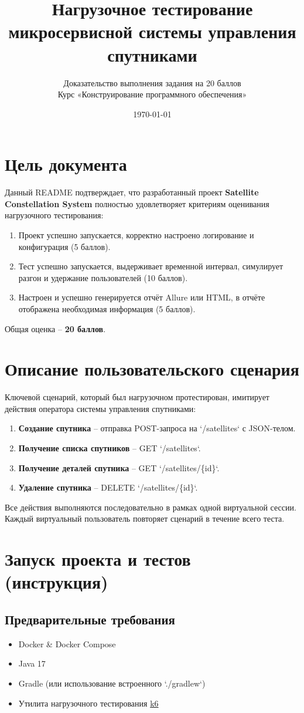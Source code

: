 \documentclass[12pt,a4paper]{article}
\title{\textbf{Нагрузочное тестирование микросервисной системы управления спутниками}}
\author{Доказательство выполнения задания на 20 баллов \\ \small Курс «Конструирование программного обеспечения»}
\date{\today}
\begin{document}
\maketitle
\tableofcontents
\newpage

\section{Цель документа}
Данный README подтверждает, что разработанный проект \textbf{Satellite Constellation System} полностью удовлетворяет критериям оценивания нагрузочного тестирования:
\begin{enumerate}
    \item Проект успешно запускается, корректно настроено логирование и конфигурация (5 баллов).
    \item Тест успешно запускается, выдерживает временной интервал, симулирует разгон и удержание пользователей (10 баллов).
    \item Настроен и успешно генерируется отчёт Allure или HTML, в отчёте отображена необходимая информация (5 баллов).
\end{enumerate}
Общая оценка – \textbf{20 баллов}.

\section{Описание пользовательского сценария}
Ключевой сценарий, который был нагрузочном протестирован, имитирует действия оператора системы управления спутниками:
\begin{enumerate}
    \item \textbf{Создание спутника} – отправка POST-запроса на `/satellites` с JSON-телом.
    \item \textbf{Получение списка спутников} – GET `/satellites`.
    \item \textbf{Получение деталей спутника} – GET `/satellites/\{id\}`.
    \item \textbf{Удаление спутника} – DELETE `/satellites/\{id\}`.
\end{enumerate}
Все действия выполняются последовательно в рамках одной виртуальной сессии. Каждый виртуальный пользователь повторяет сценарий в течение всего теста.

\section{Запуск проекта и тестов (инструкция)}
\subsection{Предварительные требования}
\begin{itemize}
    \item Docker \& Docker Compose
    \item Java 17
    \item Gradle (или использование встроенного `./gradlew`)
    \item Утилита нагрузочного тестирования \href{https://k6.io/}{k6}
\end{itemize}
\end{document}
